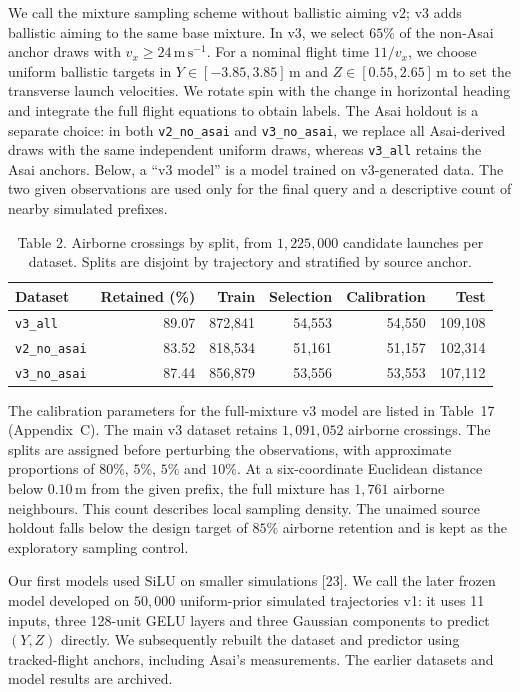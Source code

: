 We call the mixture sampling scheme without ballistic aiming v2; v3 adds ballistic aiming to the same base mixture. In v3, we select $65\%$ of the non-Asai anchor draws with $v_x\ge24\,\mathrm{m\,s^{-1}}$. For a nominal flight time $11/v_x$, we choose uniform ballistic targets in $Y\in[-3.85,3.85]\,\mathrm{m}$ and $Z\in[0.55,2.65]\,\mathrm{m}$ to set the transverse launch velocities. We rotate spin with the change in horizontal heading and integrate the full flight equations to obtain labels. The Asai holdout is a separate choice: in both \texttt{v2\_no\_asai} and \texttt{v3\_no\_asai}, we replace all Asai-derived draws with the same independent uniform draws, whereas \texttt{v3\_all} retains the Asai anchors. Below, a “v3 model” is a model trained on v3-generated data. The two given observations are used only for the final query and a descriptive count of nearby simulated prefixes.

\begin{table}[htbp]
  
  
  \caption{Table 2. Airborne crossings by split, from $1{,}225{,}000$ candidate launches per dataset. Splits are disjoint by trajectory and stratified by source anchor.}
  \begin{tabular}{lrrrrr}
    \toprule
    Dataset & Retained (\%) & Train & Selection & Calibration & Test \\
    \midrule
    \texttt{v3\_all} & 89.07 & 872,841 & 54,553 & 54,550 & 109,108 \\
    \texttt{v2\_no\_asai} & 83.52 & 818,534 & 51,161 & 51,157 & 102,314 \\
    \texttt{v3\_no\_asai} & 87.44 & 856,879 & 53,556 & 53,553 & 107,112 \\
    \bottomrule
  \end{tabular}
\end{table}

The calibration parameters for the full-mixture v3 model are listed in Table~17 (Appendix~C). The main v3 dataset retains $1{,}091{,}052$ airborne crossings. The splits are assigned before perturbing the observations, with approximate proportions of $80\%$, $5\%$, $5\%$ and $10\%$. At a six-coordinate Euclidean distance below $0.10\,\mathrm{m}$ from the given prefix, the full mixture has $1{,}761$ airborne neighbours. This count describes local sampling density. The unaimed source holdout falls below the design target of $85\%$ airborne retention and is kept as the exploratory sampling control.

Our first models used SiLU on smaller simulations [23]. We call the later frozen model developed on $50{,}000$ uniform-prior simulated trajectories v1: it uses 11 inputs, three 128-unit GELU layers and three Gaussian components to predict $(Y,Z)$ directly. We subsequently rebuilt the dataset and predictor using tracked-flight anchors, including Asai's measurements. The earlier datasets and model results are archived.

